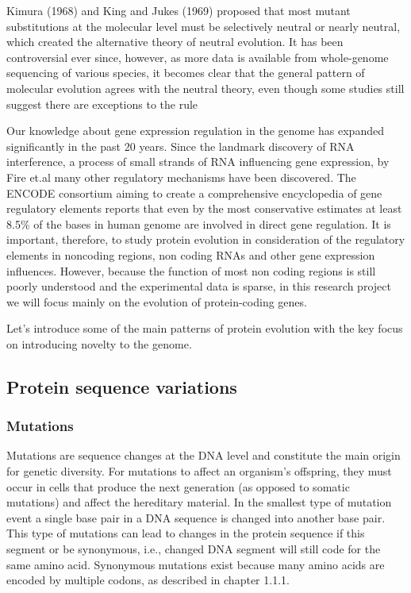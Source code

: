 \documentclass[11pt, a4paper,oneside]{report}
\begin{document}
 Kimura (1968)\cite{Kimura1968} and King and Jukes (1969)\cite{King1969} proposed that most mutant substitutions at the molecular level must be selectively neutral or nearly neutral, which created the alternative theory of neutral evolution. It has been controversial ever since, however, as more data is available from whole-genome sequencing of various species, it becomes clear that the general pattern of molecular evolution agrees with the neutral theory, even though some studies still suggest there are exceptions to the rule\cite{Haygood2007,Nielsen2007,Akey2009}  

Our knowledge about gene expression regulation in the genome has expanded significantly in the past 20 years. Since the landmark discovery of RNA interference, a process of small strands of RNA influencing gene expression, by Fire et.al \cite{Fire1998} many other regulatory mechanisms have been discovered.  The ENCODE consortium aiming to create a comprehensive encyclopedia of gene regulatory elements reports that even by the most conservative estimates at least 8.5\% of the bases in human genome are involved in direct gene regulation\cite{Bernstein2012}.  It is important, therefore, to study protein evolution in consideration of the regulatory elements in noncoding regions, non coding RNAs and other gene expression influences. However, because the function of most non coding regions is still poorly understood and the experimental data is sparse, in this research project we will focus mainly on the evolution of protein-coding genes. 

Let's introduce some of the main patterns of protein evolution with the key focus on introducing novelty to the genome.

\subsection{Protein sequence variations}
\subsubsection{Mutations}
Mutations are sequence changes at the DNA level and constitute the main origin for genetic diversity. For mutations to affect an organism's offspring, they must occur in cells that produce the next generation (as opposed to somatic mutations\cite{somatic}) and affect the hereditary material. In the smallest type of mutation event a single base pair in a DNA sequence is changed into another base pair. This type of mutations can lead to changes in the protein sequence if this segment or be synonymous, i.e., changed DNA segment will still code for the same amino acid. Synonymous mutations exist because many amino acids are encoded by multiple codons, as described in chapter 1.1.1. 
\end{document}
